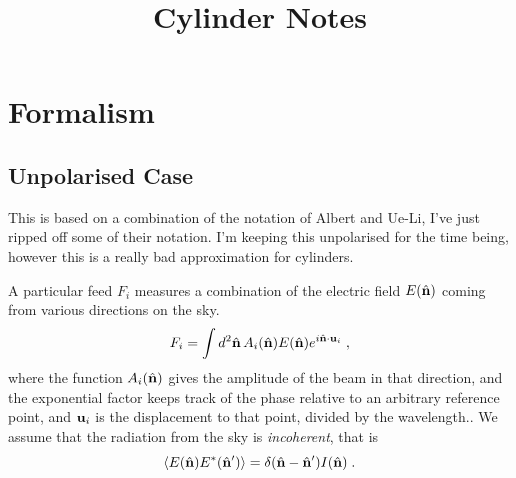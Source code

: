 \documentclass[onecolumn]{revtex4}
\begin{document}
\title{Cylinder Notes}

\maketitle



\section{Formalism}

\subsection{Unpolarised Case}

This is based on a combination of the notation of Albert and Ue-Li, I've just
ripped off some of their notation. I'm keeping this unpolarised for the time
being, however this is a really bad approximation for cylinders.

A particular feed $F_i$ measures a combination of the electric field $E(\hat{\mathbf{n}})$
coming from various directions on the sky.
\begin{equation}
F_i = \int d^2\hat{\mathbf{n}} \, A_i(\hat{\mathbf{n}}) E(\hat{\mathbf{n}}) e^{i \hat{\mathbf{n}}\cdot\mathbf{u}_i}\; ,
\end{equation}
where the function $A_i(\hat{\mathbf{n}})$ gives the amplitude of the beam in that
direction, and the exponential factor keeps track of the phase relative to an
arbitrary reference point, and $\mathbf{u}_i$ is the displacement to that point,
divided by the wavelength.. We assume that the radiation from the sky is
\emph{incoherent}, that is
\begin{equation}
\left\langle E(\hat{\mathbf{n}}) E^* (\hat{\mathbf{n}}') \right\rangle = \delta(\hat{\mathbf{n}} - \hat{\mathbf{n}}') I(\hat{\mathbf{n}}) \; .
\end{equation}
\end{document}
